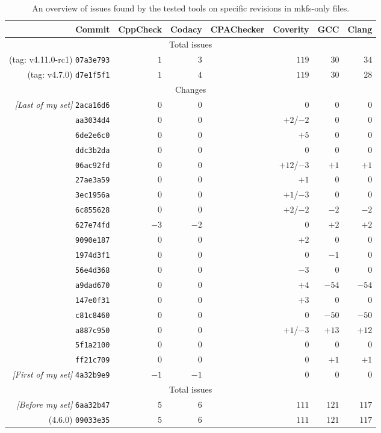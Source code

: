 \begin{table}[h]
\begin{tabular}{|r||r|r|r|r|r|r|}
\hline
Commit & CppCheck & Codacy & CPAChecker & Coverity & GCC & Clang \\
\hline
\hline
\multicolumn{7}{|c|}{Total issues}\\
\hline
(tag: v4.11.0-rc1) {\tt 07a3e793} & $1$ & $3$ & & $119$ & $30$ & $34$ \\
\hline
(tag: v4.7.0) {\tt d7e1f5f1} & $1$ & $4$ & & $119$ & $30$ & $28$ \\
\hline
\hline
\multicolumn{7}{|c|}{Changes}\\
\hline
{\em [Last of my set]} {\tt 2aca16d6} & 0 & 0 & & 0 & 0 & 0 \\
\hline
{\tt aa3034d4} & 0 & 0 & & $+2$/$-2$ & 0 & 0 \\
\hline
{\tt 6de2e6c0} & 0 & 0 & & $+5$ & 0 & 0 \\
\hline
{\tt ddc3b2da} & 0 & 0 & & 0 & 0 & 0\\
\hline
{\tt 06ac92fd} & 0 & 0 & & $+12$/$-3$ & $+1$ & $+1$\\
\hline
{\tt 27ae3a59} & 0 & 0 & & $+1$ & 0 & 0 \\
\hline
{\tt 3ec1956a} & 0 & 0 & & $+1$/$-3$ & 0 & 0 \\
\hline
{\tt 6c855628} & 0 & 0 & & $+2$/$-2$ & $-2$ & $-2$ \\
\hline
{\tt 627e74fd} & $-3$ & $-2$ & & 0 & $+2$ & $+2$ \\
\hline
{\tt 9090e187} & 0 & 0 & & $+2$ & 0 & 0 \\
\hline
{\tt 1974d3f1} & 0 & 0 & & 0 & $-1$ & 0 \\
\hline
{\tt 56e4d368} & 0 & 0 & & $-3$ & 0 & 0 \\
\hline
{\tt a9dad670} & 0 & 0 & & $+4$ & $-54$ & $-54$ \\
\hline
{\tt 147e0f31} & 0 & 0 & & $+3$ & 0 & 0 \\
\hline
{\tt c81c8460} & 0 & 0 & & 0 & $-50$ & $-50$ \\
\hline
{\tt a887c950} & 0 & 0 & & $+1$/$-3$ & $+13$ & $+12$ \\
\hline
{\tt 5f1a2100} & 0 & 0 & & 0 & 0 & 0 \\
\hline
{\tt ff21c709} & 0 & 0 & & 0 & $+1$ & $+1$ \\
\hline
{\em [First of my set]} {\tt 4a32b9e9} & $-1$ & $-1$ & & 0 & 0 & 0 \\
\hline
\hline
\multicolumn{7}{|c|}{Total issues} \\
\hline
{\em [Before my set]} {\tt 6aa32b47} & $5$ & $6$ & & $111$ & $121$ & $117$ \\
\hline
(4.6.0) {\tt 09033e35} & $5$ & $6$ & & $111$ & $121$ & $117$ \\
\hline
\end{tabular}
\caption{An overview of issues found by the tested tools on specific revisions
	in mkfs-only files.}
\label{tab:results:overview}
\end{table}

